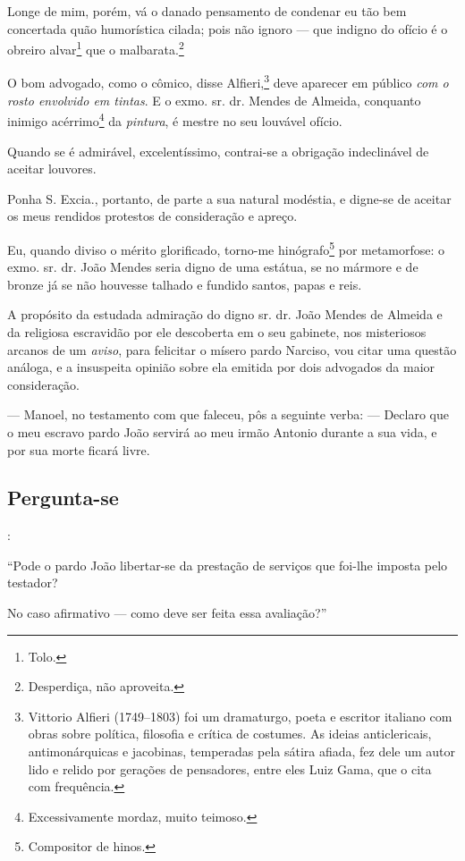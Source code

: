 {Longe de mim, porém, vá o danado pensamento de condenar eu tão bem
concertada quão humorística cilada; pois não ignoro --- que indigno do
ofício é o obreiro alvar\footnote{ Tolo.} que o
malbarata.\footnote{ Desperdiça, não aproveita.}

O bom advogado, como o cômico, disse
Alfieri\textsuperscript{⁠},\footnote{ Vittorio Alfieri (1749--1803)
  foi um dramaturgo, poeta e escritor italiano com obras sobre política,
  filosofia e crítica de costumes. As ideias anticlericais,
  antimonárquicas e jacobinas, temperadas pela sátira afiada, fez dele
  um autor lido e relido por gerações de pensadores, entre eles Luiz
  Gama, que o cita com frequência.} deve aparecer em público \emph{com o
rosto envolvido em tintas}. E o exmo. sr. dr. Mendes de Almeida,
conquanto inimigo acérrimo\footnote{ Excessivamente mordaz, muito
  teimoso.} da \emph{pintura}, é mestre no seu louvável ofício.

Quando se é admirável, excelentíssimo, contrai-se a obrigação
indeclinável de aceitar louvores.

Ponha S. Excia., portanto, de parte a sua natural modéstia, e digne-se
de aceitar os meus rendidos protestos de consideração e apreço.

Eu, quando diviso o mérito glorificado, torno-me hinógrafo\footnote{
  Compositor de hinos.} por metamorfose: o exmo. sr. dr. João Mendes
seria digno de uma estátua, se no mármore e de bronze já se não houvesse
talhado e fundido santos, papas e reis.

A propósito da estudada admiração do digno sr. dr. João Mendes de
Almeida e da religiosa escravidão por ele descoberta em o seu gabinete,
nos misteriosos arcanos de um \emph{aviso}, para felicitar o mísero
pardo Narciso, vou citar uma questão análoga, e a insuspeita opinião
sobre ela emitida por dois advogados da maior consideração.

--- Manoel, no testamento com que faleceu, pôs a seguinte verba: ---
Declaro que o meu escravo pardo João servirá ao meu irmão Antonio
durante a sua vida, e por sua morte ficará livre.

\subsection{Pergunta-se}:

``Pode o pardo João libertar-se da prestação de serviços que foi-lhe
imposta pelo testador?

No caso afirmativo --- como deve ser feita essa avaliação?''

}

